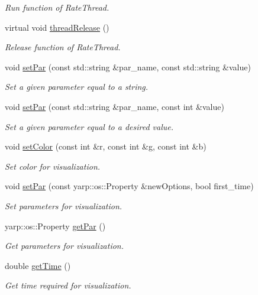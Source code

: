 \begin{DoxyCompactItemize}
\begin{DoxyCompactList}\small\item\em Run function of Rate\-Thread. \end{DoxyCompactList}\item 
virtual void \hyperlink{classSuperqVisualization_ae79d791d2accf581cbe0502d579f5416}{thread\-Release} ()\label{classSuperqVisualization_ae79d791d2accf581cbe0502d579f5416}

\begin{DoxyCompactList}\small\item\em Release function of Rate\-Thread. \end{DoxyCompactList}\item 
void \hyperlink{classSuperqVisualization_acbc374ffecb809ca16853c9475d7f347}{set\-Par} (const std\-::string \&par\-\_\-name, const std\-::string \&value)
\begin{DoxyCompactList}\small\item\em Set a given parameter equal to a string. \end{DoxyCompactList}\item 
void \hyperlink{classSuperqVisualization_a2403b8fcb9448e61866fd39035a482f0}{set\-Par} (const std\-::string \&par\-\_\-name, const int \&value)
\begin{DoxyCompactList}\small\item\em Set a given parameter equal to a desired value. \end{DoxyCompactList}\item 
void \hyperlink{classSuperqVisualization_a82eb6b92c07720b35c714a3c8e2f88a3}{set\-Color} (const int \&r, const int \&g, const int \&b)
\begin{DoxyCompactList}\small\item\em Set color for visualization. \end{DoxyCompactList}\item 
void \hyperlink{classSuperqVisualization_a5250a90e5865bf45c0bd8ae919b8eab0}{set\-Par} (const yarp\-::os\-::\-Property \&new\-Options, bool first\-\_\-time)
\begin{DoxyCompactList}\small\item\em Set parameters for visualization. \end{DoxyCompactList}\item 
yarp\-::os\-::\-Property \hyperlink{classSuperqVisualization_ae4fac8f79629a3fa81a688ab4baf61f7}{get\-Par} ()
\begin{DoxyCompactList}\small\item\em Get parameters for visualization. \end{DoxyCompactList}\item 
double \hyperlink{classSuperqVisualization_a9583b378f68f466a76022817d3051c6e}{get\-Time} ()
\begin{DoxyCompactList}\small\item\em Get time required for visualization. \end{DoxyCompactList}\end{DoxyCompactItemize}
